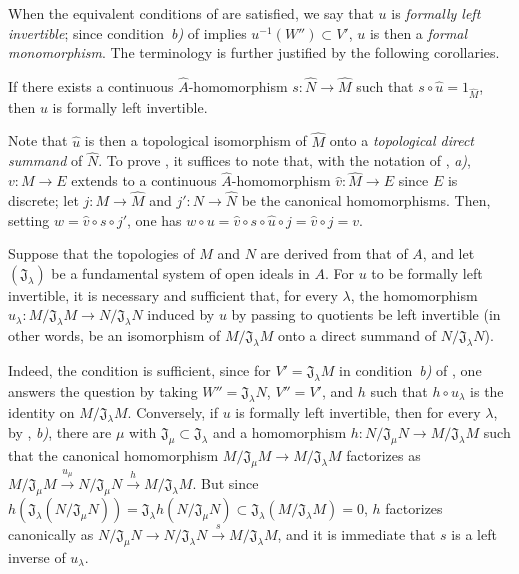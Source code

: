 When the equivalent conditions of  are satisfied, we say that $u$ is \emph{formally left invertible};
since condition~\emph{b)} of  implies $u^{-1}(W'')\subset V'$, $u$ is then a \emph{formal monomorphism}.
The terminology is further justified by the following corollaries.

\begin{corollary}[19.1.6]
\label{0.19.1.6}
If there exists a continuous $\widehat A$-homomorphism $s:\widehat N\to\widehat M$ such that $s\circ\widehat u=1_{\widehat M}$, then $u$ is formally left invertible.
\end{corollary}

Note that $\widehat u$ is then a topological isomorphism of $\widehat M$ onto a \emph{topological direct summand} of $\widehat N$.
To prove , it suffices to note that, with the notation of , \emph{a)}, $v:M\to E$ extends to a continuous $\widehat A$-homomorphism $\widehat v:\widehat M\to E$ since $E$ is discrete;
let $j:M\to\widehat M$ and $j':N\to\widehat N$ be the canonical homomorphisms.
Then, setting $w=\widehat v\circ s\circ j'$, one has $w\circ u=\widehat v\circ s\circ\widehat u\circ j=\widehat v\circ j=v$.

\begin{corollary}[19.1.7]
\label{0.19.1.7}
Suppose that the topologies of $M$ and $N$ are derived from that of $A$, and let $(\mathfrak J_\lambda)$ be a fundamental system of open ideals in $A$.
For $u$ to be formally left invertible, it is necessary and sufficient that, for every $\lambda$, the homomorphism $u_\lambda:M/\mathfrak J_\lambda M\longrightarrow N/\mathfrak J_\lambda N$
induced by $u$ by passing to quotients be left invertible \textup{(in other words, be an isomorphism of $M/\mathfrak J_\lambda M$ onto a direct summand of $N/\mathfrak J_\lambda N$)}.
\end{corollary}

Indeed, the condition is sufficient, since for $V'=\mathfrak J_\lambda M$ in condition~\emph{b)} of , one answers the question by taking $W''=\mathfrak J_\lambda N$, $V''=V'$, and $h$ such that $h\circ u_\lambda$ is the identity on $M/\mathfrak J_\lambda M$.
Conversely, if $u$ is formally left invertible, then for every $\lambda$, by , \emph{b)}, there are $\mu$ with $\mathfrak J_\mu\subset\mathfrak J_\lambda$ and a homomorphism $h:N/\mathfrak J_\mu N\to M/\mathfrak J_\lambda M$ such that the canonical homomorphism $M/\mathfrak J_\mu M\to M/\mathfrak J_\lambda M$ factorizes as $M/\mathfrak J_\mu M\xrightarrow{u_\mu}N/\mathfrak J_\mu N\xrightarrow{h}M/\mathfrak J_\lambda M$.
But since
$h(\mathfrak J_\lambda(N/\mathfrak J_\mu N))=\mathfrak J_\lambda h(N/\mathfrak J_\mu N)
 \subset\mathfrak J_\lambda(M/\mathfrak J_\lambda M)=0$,
$h$ factorizes canonically as $N/\mathfrak J_\mu N\longrightarrow N/\mathfrak J_\lambda N\xrightarrow{s}M/\mathfrak J_\lambda M$,
and it is immediate that $s$ is a left inverse of $u_\lambda$.


